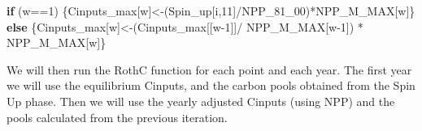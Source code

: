 \documentclass[
  10pt,
  b5paper,
]{book}
\newenvironment{Shaded}{\begin{snugshade}}{\end{snugshade}}
\newcommand{\ControlFlowTok}[1]{\textcolor[rgb]{0.13,0.29,0.53}{\textbf{#1}}}
\newcommand{\DecValTok}[1]{\textcolor[rgb]{0.00,0.00,0.81}{#1}}
\newcommand{\NormalTok}[1]{#1}
\newcommand{\OtherTok}[1]{\textcolor[rgb]{0.56,0.35,0.01}{#1}}
\newcommand{\SpecialCharTok}[1]{\textcolor[rgb]{0.00,0.00,0.00}{#1}}
\begin{document}
\begin{Shaded}
\begin{Highlighting}[]
\ControlFlowTok{if}\NormalTok{ (w}\SpecialCharTok{==}\DecValTok{1}\NormalTok{) \{Cinputs\_max[w]}\OtherTok{\textless{}{-}}\NormalTok{(Spin\_up[i,}\DecValTok{11}\NormalTok{]}\SpecialCharTok{/}\NormalTok{NPP\_81\_00)}\SpecialCharTok{*}\NormalTok{NPP\_M\_MAX[w]\} }\ControlFlowTok{else}\NormalTok{ \{Cinputs\_max[w]}\OtherTok{\textless{}{-}}\NormalTok{(Cinputs\_max[[w}\DecValTok{{-}1}\NormalTok{]]}\SpecialCharTok{/}\NormalTok{ NPP\_M\_MAX[w}\DecValTok{{-}1}\NormalTok{]) }\SpecialCharTok{*}\NormalTok{ NPP\_M\_MAX[w]\} }
\end{Highlighting}
\end{Shaded}

We will then run the RothC function for each point and each year. The first year we will use the equilibrium Cinputs, and the carbon pools obtained from the Spin Up phase. Then we will use the yearly adjusted Cinputs (using NPP) and the pools calculated from the previous iteration.
\end{document}
